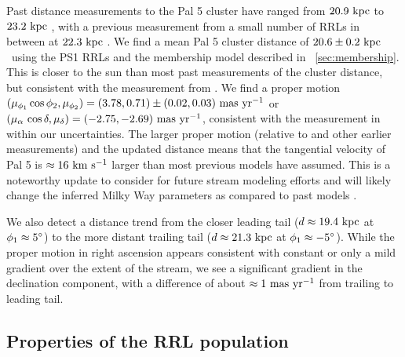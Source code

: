 \documentclass[twocolumn]{aastex63}
\newcommand{\sa}[1]{{\color{teal} SP: #1}}
\newcommand{\clderr}{\ensuremath{20.6 \pm 0.2~\kpc}}
\begin{document}
Past distance measurements to the Pal 5 cluster have ranged from $20.9~\mathrm{kpc}$ \citep{Dotter:2011} to $23.2~\mathrm{kpc}$ \citep{Harris:1996}, with a previous measurement from a small number of RRLs in between at $22.3~\mathrm{kpc}$ \citep{Vivas:2006}.
We find a mean Pal 5 cluster distance of \clderr\ using the PS1 RRLs and the membership model described in \sectionname~\ref{sec:membership}.
This is closer to the sun than most past measurements of the cluster distance, but consistent with the measurement from \citet{Dotter:2011}.
We find a proper motion $(\mu_{\phi_1}\cos\phi_2, \mu_{\phi_2}) = (3.78, 0.71) \pm (0.02, 0.03)~\mathrm{mas}~\mathrm{yr}^{-1}$ or $(\mu_\alpha\,\cos\delta, \mu_\delta) = (-2.75, -2.69)~\mathrm{mas}~\mathrm{yr}^{-1}$, consistent with the measurement in \citet{Vasiliev:2019} within our uncertainties.
The larger proper motion (relative to \citealt{Fritz:2015} and other earlier measurements) and the updated distance means that the tangential velocity of Pal 5 is $\approx 16~\mathrm{km}~\mathrm{s}^{-1}$ larger than most previous models have assumed.
This is a noteworthy update to consider for future stream modeling efforts and will likely change the inferred Milky Way parameters as compared to past models \citep[e.g.,][]{Kuepper:2015, Bovy:2016}.

We also detect a distance trend from the closer leading tail ($d \approx 19.4~\mathrm{kpc}$ at $\phi_1 \approx 5\mbox{$^\circ$}$) to the more distant trailing tail ($d \approx 21.3~\mathrm{kpc}$ at $\phi_1 \approx -5\mbox{$^\circ$}$).
While the proper motion in right ascension appears consistent with constant or only a mild gradient over the extent of the stream, we see a significant gradient in the declination component, with a difference of about $\approx 1~\mathrm{mas}~\mathrm{yr}^{-1}$ from trailing to leading tail.

\subsection{Properties of the RRL population}
\end{document}
